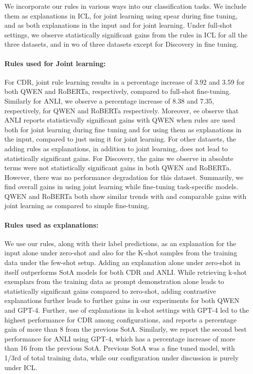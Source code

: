 We incorporate our rules in various ways into our classification tasks. We include them as explanations in ICL, for joint learning using spear during fine tuning, and as both explanations in the input and for joint learning. Under full-shot settings, we observe statistically significant gains from the rules in ICL for all the three datasets, and in wo of three datasets except for Discovery in fine tuning. 

\paragraph{Rules used for Joint learning:} For CDR, joint rule learning results in a percentage increase of 3.92 and 3.59 for both QWEN and RoBERTa, respectively, compared to full-shot fine-tuning.  Similarly for ANLI, we observe a percentage increase of 8.38 and 7.35, respectively, for QWEN and RoBERTa respectively. Moreover, ee observe that ANLI reports statisticvally significant gains with QWEN when rules are used both for joint learning during fine tuning and for using them as explanations in the input, compared to just using it for joint learning. For other datasets, the adding rules as explanations, in addition to joint learning, does not lead to statistically significant gains. For Discovery, the gains we observe in absolute terms were not statistically significant gains in both QWEN and RoBERTa. However, there was no performance degradation for this dataset. Summarily, we find overall gains in using joint learning while fine-tuning task-specific models.  QWEN and RoBERTa both show similar trends with and comparable gains with joint learning as compared to simple fine-tuning.

\paragraph{Rules used as explanations:}  We use our rules, along with their label predictions, as an explanation for the input alone under zero-shot and also for the K-shot samples from the training data under the few-shot setup. Adding an explanation alone under zero-shot in itself outperforms SotA models for both CDR and ANLI. While retrieving k-shot exemplars from the training data as prompt demonstration alone leads to statistically significant gains compared to zero-shot, adding contrastive explanations further leads to further gains in our experiments for both QWEN and GPT-4. Further, use of explanations in k-shot settings with GPT-4 led to the highest performance for CDR among configurations, and reports a percentage gain of more than 8 from the previous SotA. Similarly, we report the second best performance for ANLI using GPT-4, which has a percentage increase of more than 16 from the previous SotA. Previous SotA was a fine tuned model, with 1/3rd of total training data, while our configuration under discussion is purely under ICL. 


